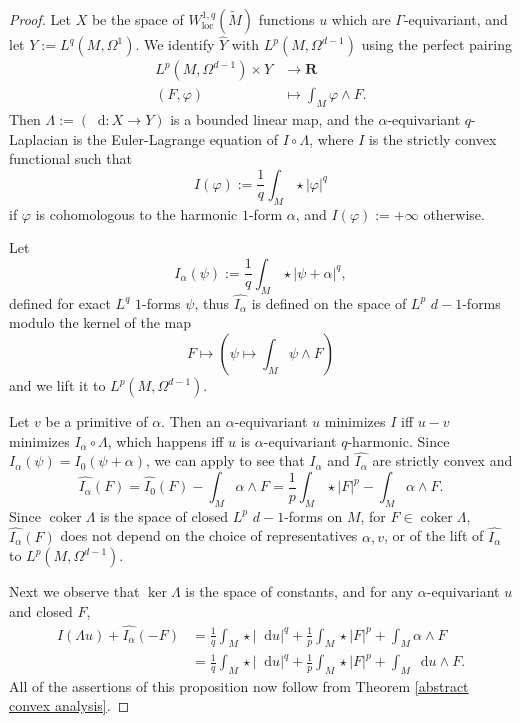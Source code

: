 \documentclass[reqno,11pt]{amsart}
\newcommand{\RR}{\mathbf{R}}
\newcommand*\dif{\mathop{}\!\mathrm{d}}
\DeclareMathOperator{\coker}{coker}
\newcommand{\loc}{\mathrm{loc}}
\theoremstyle{definition}
\numberwithin{equation}{section}
\begin{document}
\begin{proof}
Let $X$ be the space of $W^{1, q}_\loc(\tilde M)$ functions $u$ which are $\Gamma$-equivariant, and let $Y := L^q(M, \Omega^1)$.
We identify $\hat Y$ with $L^p(M, \Omega^{d - 1})$ using the perfect pairing 
\begin{align*}
	L^p(M, \Omega^{d - 1}) \times Y &\to \RR \\
	(F, \varphi) &\mapsto \int_M \varphi \wedge F.
\end{align*}
Then $\Lambda := (\dif: X \to Y)$ is a bounded linear map, and the $\alpha$-equivariant $q$-Laplacian is the Euler-Lagrange equation of $I \circ \Lambda$, where $I$ is the strictly convex functional such that
$$I(\varphi) := \frac{1}{q} \int_M \star |\varphi|^q$$
if $\varphi$ is cohomologous to the harmonic $1$-form $\alpha$, and $I(\varphi) := +\infty$ otherwise.

Let
$$I_\alpha(\psi) := \frac{1}{q} \int_M \star |\psi + \alpha|^q,$$
defined for exact $L^q$ $1$-forms $\psi$, thus $\widehat{I_\alpha}$ is defined on the space of $L^p$ $d - 1$-forms modulo the kernel of the map
$$F \mapsto \left(\psi \mapsto \int_M \psi \wedge F\right)$$
and we lift it to $L^p(M, \Omega^{d - 1})$.

Let $v$ be a primitive of $\alpha$.
Then an $\alpha$-equivariant $u$ minimizes $I$ iff $u - v$ minimizes $I_\alpha \circ \Lambda$, which happens iff $u$ is $\alpha$-equivariant $q$-harmonic.
Since $I_\alpha(\psi) = I_0(\psi + \alpha)$, we can apply \cite[Chapter I, Remark 4.1]{Ekeland99} to see that $I_\alpha$ and $\widehat{I_\alpha}$ are strictly convex and
$$\widehat{I_\alpha}(F) = \widehat{I_0}(F) - \int_M \alpha \wedge F = \frac{1}{p} \int_M \star |F|^p - \int_M \alpha \wedge F.$$
Since $\coker \Lambda$ is the space of closed $L^p$ $d - 1$-forms on $M$, for $F \in \coker \Lambda$, $\widehat{I_\alpha}(F)$ does not depend on the choice of representatives $\alpha, v$, or of the lift of $\widehat{I_\alpha}$ to $L^p(M, \Omega^{d - 1})$.

Next we observe that $\ker \Lambda$ is the space of constants, and for any $\alpha$-equivariant $u$ and closed $F$,
\begin{align*}
I(\Lambda u) + \widehat{I_\alpha}(-F)
&= \frac{1}{q} \int_M \star |\dif u|^q + \frac{1}{p} \int_M \star |F|^p + \int_M \alpha \wedge F \\
&= \frac{1}{q} \int_M \star |\dif u|^q + \frac{1}{p} \int_M \star |F|^p + \int_M \dif u \wedge F.
\end{align*}
All of the assertions of this proposition now follow from Theorem \ref{abstract convex analysis}.
\end{proof}
\end{document}
